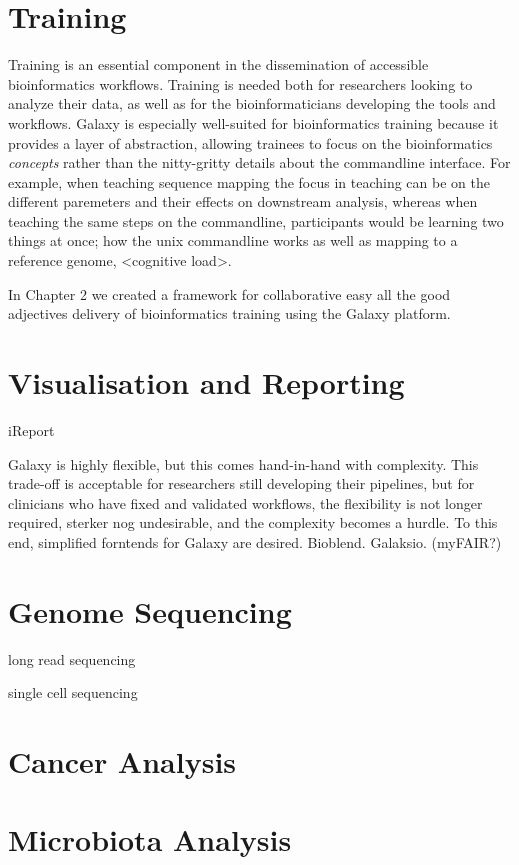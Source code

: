 \section{Training}
Training is an essential component in the dissemination of accessible bioinformatics workflows. Training is needed both for researchers looking to analyze their data, as well as for the bioinformaticians developing the tools and workflows. Galaxy is especially well-suited for bioinformatics training because it provides a layer of abstraction, allowing trainees to focus on the bioinformatics \emph{concepts} rather than the nitty-gritty details about the commandline interface. For example, when teaching sequence mapping the focus in teaching can be on the different paremeters and their effects on downstream analysis, whereas when teaching the same steps on the commandline, participants would be learning two things at once; how the unix commandline works as well as mapping to a reference genome, <cognitive load>.

In Chapter 2 we created a framework for collaborative easy all the good adjectives delivery of bioinformatics training using the Galaxy platform.


\section{Visualisation and Reporting}

iReport

Galaxy is highly flexible, but this comes hand-in-hand with complexity. This trade-off is acceptable for researchers still developing their pipelines, but for clinicians who have fixed and validated workflows, the flexibility is not longer required, sterker nog undesirable, and the complexity becomes a hurdle. To this end, simplified forntends for Galaxy are desired. Bioblend. Galaksio. (myFAIR?)


\section{Genome Sequencing}

long read sequencing

single cell sequencing

\section{Cancer Analysis}

\section{Microbiota Analysis}


